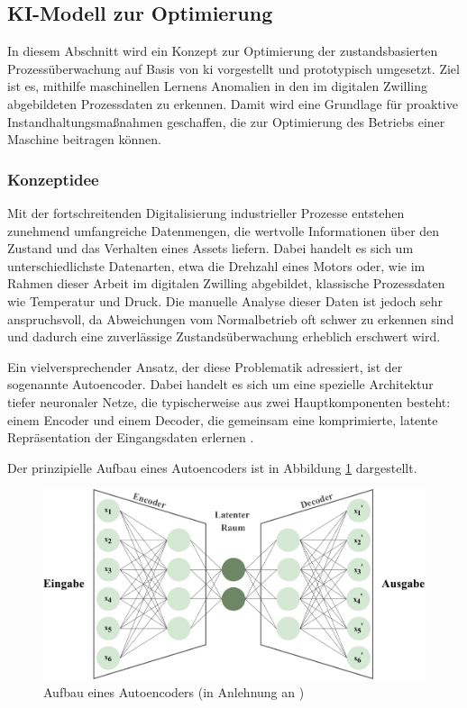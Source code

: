 \newpage
\subsection{KI-Modell zur Optimierung}
In diesem Abschnitt wird ein Konzept zur Optimierung der zustandsbasierten Prozessüberwachung auf Basis von \acs{ki} vorgestellt und prototypisch umgesetzt.
Ziel ist es, mithilfe maschinellen Lernens Anomalien in den im digitalen Zwilling abgebildeten Prozessdaten zu erkennen.
Damit wird eine Grundlage für proaktive Instandhaltungsmaßnahmen geschaffen, die zur Optimierung des Betriebs einer Maschine beitragen können.

\subsubsection{Konzeptidee}

Mit der fortschreitenden Digitalisierung industrieller Prozesse entstehen zunehmend umfangreiche Datenmengen, die wertvolle Informationen über den Zustand und das Verhalten eines Assets liefern. 
Dabei handelt es sich um unterschiedlichste Datenarten, etwa die Drehzahl eines Motors oder, wie im Rahmen dieser Arbeit im digitalen Zwilling abgebildet, klassische Prozessdaten wie Temperatur und Druck.
Die manuelle Analyse dieser Daten ist jedoch sehr anspruchsvoll, da Abweichungen vom Normalbetrieb oft schwer zu erkennen sind und dadurch eine zuverlässige Zustandsüberwachung erheblich erschwert wird.

Ein vielversprechender Ansatz, der diese Problematik adressiert, ist der sogenannte \mbox{Autoencoder}. 
Dabei handelt es sich um eine spezielle Architektur tiefer neuronaler Netze, die typischerweise aus zwei Hauptkomponenten besteht: einem Encoder und einem Decoder, die gemeinsam eine komprimierte, latente Repräsentation der Eingangsdaten erlernen \cite{Lempitsky2019}.

Der prinzipielle Aufbau eines Autoencoders ist in Abbildung \ref{fig:Autoencoder} dargestellt.

\vspace{0.5em}
\begin{figure}[htbp]
    \centering
    \includegraphics[width=1\textwidth]{Bilder/Autoencoder/AutoencoderModell.pdf}
    \caption[Aufbau eines Autoencoders]{Aufbau eines Autoencoders (in Anlehnung an \cite{AutoencoderBild})}
    \label{fig:Autoencoder}
\end{figure}

